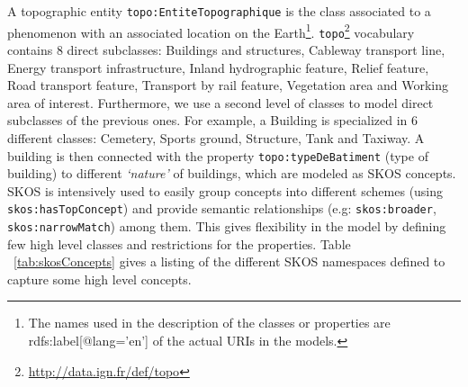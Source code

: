 A topographic entity \texttt{topo:EntiteTopographique} is the class associated to a phenomenon with an associated location on the Earth\footnote{The names used in the description of the classes or properties are rdfs:label[@lang='en'] of the actual URIs in the models.}. \texttt{topo}\footnote{\url{http://data.ign.fr/def/topo}} vocabulary contains $8$ direct subclasses: Buildings and structures, Cableway transport line, Energy transport infrastructure, Inland hydrographic feature, Relief feature, Road transport feature, Transport by rail feature, Vegetation area and Working area of interest. Furthermore, we use a second level of classes to model direct subclasses of the previous ones. For example, a Building is specialized in $6$ different classes: Cemetery, Sports ground, Structure, Tank and Taxiway. A building is then connected with the property \texttt{topo:typeDeBatiment} (type of building) to different \textit{`nature'} of buildings, which are modeled as SKOS concepts. SKOS is intensively used to easily group concepts into different schemes (using \texttt{skos:hasTopConcept}) and provide semantic relationships (e.g: \texttt{skos:broader}, \texttt{skos:narrowMatch}) among them. This gives flexibility in the model by defining few high level classes and restrictions for the properties. Table ~\ref{tab:skosConcepts} gives a listing of the different SKOS namespaces defined to capture some high level concepts.

